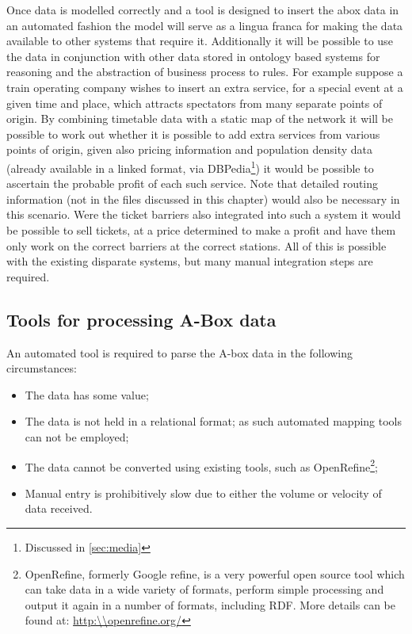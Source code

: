 Once data is modelled correctly and a tool is designed to insert the abox data in an automated fashion the model will serve as a lingua franca for making the data available to other systems that require it. Additionally it will be possible to use the data in conjunction with other data stored in ontology based systems for reasoning and the abstraction of business process to rules. For example suppose a train operating company wishes to insert an extra service, for a special event at a given time and place, which attracts spectators from many separate points of origin. By combining timetable data with a static map of the network it will be possible to work out whether it is possible to add extra services from various points of origin, given also pricing information and population density data (already available in a linked format, via DBPedia\footnote{Discussed in \autoref{sec:media}}) it would be possible to ascertain the probable profit of each such service. Note that detailed routing information (not in the files discussed in this chapter) would also be necessary in this scenario. Were the ticket barriers also integrated into such a system it would be possible to sell tickets, at a price determined to make a profit and have them only work on the correct barriers at the correct stations. All of this is possible with the existing disparate systems, but many manual integration steps are required.

\subsection{Tools for processing A-Box data}

An automated tool is required to parse the A-box data in the following circumstances:

 \begin{itemize}
 	\item The data has some value;
	\item The data is not held in a relational format; as such automated mapping tools can not be employed;
	\item The data cannot be converted using existing tools, such as OpenRefine\footnote{OpenRefine, formerly Google refine, is a very powerful open source tool which can take data in a wide variety of formats, perform simple processing and output it again in a number of formats, including RDF. More details can be found at: \url{http:\\openrefine.org/}};
	\item Manual entry is prohibitively slow due to either the volume or velocity of data received.
\end{itemize}

